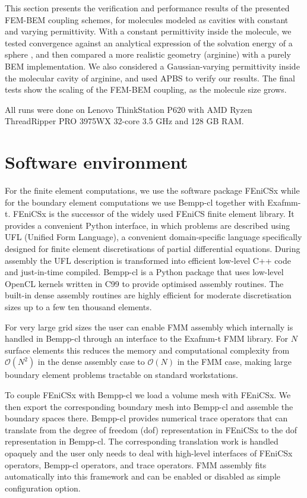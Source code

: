 This section presents the verification and performance results of the presented FEM-BEM coupling schemes, for molecules modeled as cavities with constant and varying permittivity.
With a constant permittivity inside the molecule, we tested convergence against an analytical expression of the solvation energy of a sphere \cite{Kirkwood1934}, and then compared a more realistic geometry (arginine) with a purely BEM implementation.
We also considered a Gaussian-varying permittivity\cite{grant2001smooth,li2013dielectric} inside the molecular cavity of arginine, and used APBS \cite{BakerETal2001} to verify our results.
The final tests show the scaling of the FEM-BEM coupling, as the molecule size grows. 

All runs were done on Lenovo ThinkStation P620 with AMD Ryzen ThreadRipper PRO 3975WX 32-core 3.5 GHz and 128 GB RAM. 

\section*{\sffamily \Large Software environment}

For the finite element computations, we use the software package FEniCSx while for the boundary element computations we use Bempp-cl together with Exafmm-t. FEniCSx is the successor of the widely used FEniCS finite element library.
It provides a convenient Python interface, in which problems are described using UFL (Unified Form Language), a convenient domain-specific language specifically designed for finite element discretisations of partial differential equations. During assembly the UFL description is transformed into efficient low-level C++ code and just-in-time compiled. Bempp-cl is a Python package that uses low-level OpenCL kernels written in C99 to provide optimised assembly routines. The built-in dense assembly routines are highly efficient for moderate discretisation sizes up to a few ten thousand elements.

For very large grid sizes the user can enable FMM assembly which internally is handled in Bempp-cl through an interface to the Exafmm-t FMM library. For $N$ surface elements this reduces the memory and computational complexity from $\mathcal{O}(N^2)$ in the dense assembly case to $\mathcal{O}(N)$ in the FMM case, making large boundary element problems tractable on standard workstations.

To couple FEniCSx with Bempp-cl we load a volume mesh with FEniCSx. We then export the corresponding boundary mesh into Bempp-cl and assemble the boundary spaces there. Bempp-cl provides numerical trace operators that can translate from the degree of freedom (dof) representation in FEniCSx to the dof representation in Bempp-cl. The corresponding translation work is handled opaquely and the user only needs to deal with high-level interfaces of FEniCSx operators, Bempp-cl operators, and trace operators. FMM assembly fits automatically into this framework and can be enabled or disabled as simple configuration option.

